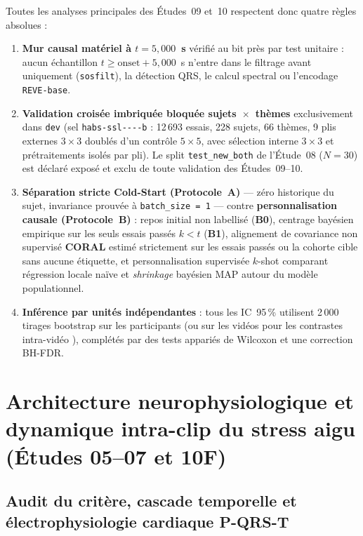 \documentclass[10pt]{article}
\begin{document}
Toutes les analyses principales des Études~09 et~10 respectent donc quatre règles absolues :
\begin{enumerate}
\item \textbf{Mur causal matériel à $t = 5{,}000$~s} vérifié au bit près par test unitaire : aucun échantillon $t \ge \text{onset} + 5{,}000$~s n'entre dans le filtrage avant uniquement (\texttt{sosfilt}), la détection QRS, le calcul spectral ou l'encodage \texttt{REVE-base}.
\item \textbf{Validation croisée imbriquée bloquée sujets~$\times$~thèmes} exclusivement dans \texttt{dev} (sel \texttt{habs-ssl----b} : 12\,693 essais, 228 sujets, 66 thèmes, 9 plis externes $3 \times 3$ doublés d'un contrôle $5 \times 5$, avec sélection interne $3 \times 3$ et prétraitements isolés par pli). Le split \texttt{test\_\allowbreak new\_\allowbreak both} de l'Étude~08 ($N = 30$) est déclaré exposé et exclu de toute validation des Études~09--10.
\item \textbf{Séparation stricte Cold-Start (Protocole~A)} — zéro historique du sujet, invariance prouvée à \texttt{batch\_size = 1} — contre \textbf{personnalisation causale (Protocole~B)} : repos initial non labellisé (\textbf{B0}), centrage bayésien empirique sur les seuls essais passés $k < t$ (\textbf{B1}), alignement de covariance non supervisé \textbf{CORAL} \cite{sun2016,mihirette2025} estimé strictement sur les essais passés ou la cohorte cible sans aucune étiquette, et personnalisation supervisée $k$-shot comparant régression locale naïve et \emph{shrinkage} bayésien MAP autour du modèle populationnel.
\item \textbf{Inférence par unités indépendantes} : tous les IC~95\,\% utilisent 2\,000 tirages bootstrap sur les participants (ou sur les vidéos pour les contrastes intra-vidéo \cite{varoquaux2018}), complétés par des tests appariés de Wilcoxon et une correction BH-FDR.
\end{enumerate}

\section{Architecture neurophysiologique et dynamique intra-clip du stress aigu (Études 05--07 et 10F)}
\label{sec:physio}

\subsection{Audit du critère, cascade temporelle et électrophysiologie cardiaque P-QRS-T}
\end{document}
